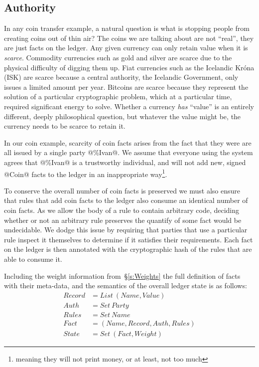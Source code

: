 \subsection{Authority}
\label{s:Authority}
In any coin transfer example, a natural question is what is stopping people from creating coins out of thin air? The coins we are talking about are not ``real'', they are just facts on the ledger. Any given currency can only retain value when it is \emph{scarce}. Commodity currencies such as gold and silver are scarce due to the physical difficulty of digging them up. Fiat currencies such as the Icelandic Kr\'ona (ISK) are scarce because a central authority, the Icelandic Government, only issues a limited amount per year. Bitcoins are scarce because they represent the solution of a particular cryptographic problem, which at a particular time, required significant energy to solve. Whether a currency \emph{has} ``value'' is an entirely different, deeply philosophical question, but whatever the value might be, the currency needs to be scarce to retain it.

In our coin example, scarcity of coin facts arises from the fact that they were are all issued by a single party @\%Ivan@. We assume that everyone using the system agrees that @\%Ivan@ is a trustworthy individual, and will not add new, signed @Coin@ facts to the ledger in an inappropriate way\footnote{meaning they will not print money, or at least, not too much}.

To conserve the overall number of coin facts is preserved we must also ensure that rules that add coin facts to the ledger also consume an identical number of coin facts. As we allow the body of a rule to contain arbitrary code, deciding whether or not an arbitrary rule preserves the quantify of some fact would be undecidable. We dodge this issue by requiring that parties that use a particular rule inspect it themselves to determine if it satisfies their requirements. Each fact on the ledger is then annotated with the cryptographic hash of the rules that are able to consume it.

\eject
Including the weight information from~\S\ref{s:Weights} the full definition of facts with their meta-data, and the semantics of the overall ledger state is as follows:
$$
\begin{array}{ll}
   Record  & = List~ (Name, Value)
\\ Auth    & = Set~ Party
\\ Rules   & = Set~ Name
\\ Fact    & = (Name, Record, Auth, Rules)
\\ State   & = Set~ (Fact, Weight)
\end{array}
$$

